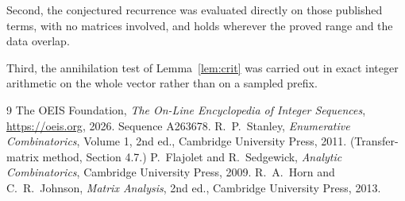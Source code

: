 \documentclass[11pt,a4paper]{article}
\theoremstyle{plain}
\theoremstyle{definition}
\begin{document}
Second, the conjectured recurrence was evaluated directly on those published terms, with no
matrices involved, and holds wherever the proved range and the data overlap.

Third, the annihilation test of Lemma~\ref{lem:crit} was carried out in exact integer
arithmetic on the whole vector rather than on a sampled prefix.

\begin{thebibliography}{9}
 The OEIS Foundation, \emph{The On-Line Encyclopedia of Integer
Sequences}, \url{https://oeis.org}, 2026. Sequence A263678.
 R.~P.~Stanley, \emph{Enumerative Combinatorics}, Volume 1, 2nd ed.,
Cambridge University Press, 2011. (Transfer-matrix method, Section 4.7.)
 P.~Flajolet and R.~Sedgewick, \emph{Analytic Combinatorics}, Cambridge
University Press, 2009.
 R.~A.~Horn and C.~R.~Johnson, \emph{Matrix Analysis}, 2nd ed., Cambridge
University Press, 2013.
\end{thebibliography}
\end{document}
